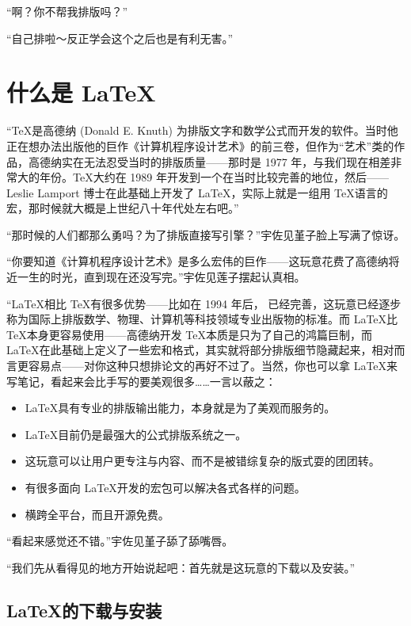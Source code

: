 “啊？你不帮我排版吗？”

“自己排啦～反正学会这个之后也是有利无害。”

\section{什么是 \LaTeX}

“\TeX 是高德纳 (Donald E. Knuth) 为排版文字和数学公式而开发的软件。当时他正在想办法出版他的巨作《计算机程序设计艺术》的前三卷，但作为“艺术”类的作品，高德纳实在无法忍受当时的排版质量——那时是 1977 年，与我们现在相差非常大的年份。\TeX 大约在 1989 年开发到一个在当时比较完善的地位，然后—— Leslie Lamport 博士在此基础上开发了 \LaTeX，实际上就是一组用 \TeX 语言的宏，那时候就大概是上世纪八十年代处左右吧。”

“那时候的人们都那么勇吗？为了排版直接写引擎？”宇佐见堇子脸上写满了惊讶。

“你要知道《计算机程序设计艺术》是多么宏伟的巨作——这玩意花费了高德纳将近一生的时光，直到现在还没写完。”宇佐见莲子摆起认真相。

“\LaTeX 相比 \TeX 有很多优势——比如在 1994 年后，\LaTeXe{} 已经完善，这玩意已经逐步称为国际上排版数学、物理、计算机等科技领域专业出版物的标准。而 \LaTeX 比 \TeX 本身更容易使用——高德纳开发 \TeX 本质是只为了自己的鸿篇巨制，而 \LaTeX 在此基础上定义了一些宏和格式，其实就将部分排版细节隐藏起来，相对而言更容易点——对你这种只想排论文的再好不过了。当然，你也可以拿 \LaTeX 来写笔记，看起来会比手写的要美观很多……一言以蔽之：


\begin{itemize}
    \item \LaTeX 具有专业的排版输出能力，本身就是为了美观而服务的。
    \item \LaTeX 目前仍是最强大的公式排版系统之一。
    \item 这玩意可以让用户更专注与内容、而不是被错综复杂的版式耍的团团转。
    \item 有很多面向 \LaTeX 开发的宏包可以解决各式各样的问题。
    \item 横跨全平台，而且开源免费。
\end{itemize}

“看起来感觉还不错。”宇佐见堇子舔了舔嘴唇。

“我们先从看得见的地方开始说起吧：首先就是这玩意的下载以及安装。”

\subsection{\LaTeX 的下载与安装}

